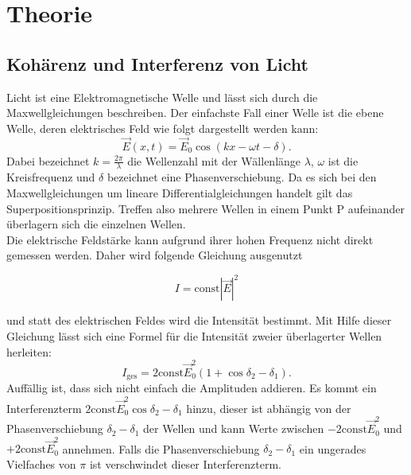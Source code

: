 
\section{Theorie}
\subsection{Kohärenz und Interferenz von Licht}
Licht ist eine Elektromagnetische Welle und lässt sich durch die Maxwellgleichungen
beschreiben. Der einfachste Fall einer Welle ist die ebene Welle, deren elektrisches Feld
wie folgt dargestellt werden kann:
\begin{equation}
  \vec{E}(x,t)=\vec{E}_{0}\cos(kx-\omega t -\delta)
  \label{eqn:eben}.
\end{equation}
Dabei bezeichnet $k=\frac{2\pi}{\lambda}$ die Wellenzahl mit der Wällenlänge $\lambda$,
$\omega$ ist die Kreisfrequenz und $\delta$ bezeichnet eine Phasenverschiebung.
Da es sich bei den Maxwellgleichungen um lineare Differentialgleichungen handelt
gilt das Superpositionsprinzip. Treffen also mehrere Wellen in einem Punkt P
aufeinander überlagern sich die einzelnen Wellen.\\
Die elektrische Feldstärke kann aufgrund ihrer hohen Frequenz %
nicht direkt gemessen werden. Daher wird folgende Gleichung ausgenutzt

\begin{equation}
  I=\text{const} |\vec{E}|^{2}
  \label{eqn:intensität}
\end{equation}

und statt des elektrischen Feldes wird die Intensität bestimmt.
\label{sec:Theorie}
Mit Hilfe dieser Gleichung lässt sich eine Formel für die Intensität zweier
überlagerter Wellen herleiten:
\begin{equation}
  I_{\text{ges}}=2\text{const}\vec{E}_{0}^{2}(1+\cos{\delta_{2}-\delta_{1}})
  \label{eqn:iges}.
\end{equation}
Auffällig ist, dass sich nicht einfach die Amplituden addieren. Es kommt ein Interferenzterm
$2\text{const}\vec{E}_{0}^{2}\cos{\delta_{2}-\delta_{1}}$ hinzu, dieser ist abhängig von
der Phasenverschiebung $\delta_{2}-\delta_{1}$ der Wellen und kann Werte zwischen
$-2\text{const}\vec{E}_{0}^{2}$ und $+2\text{const}\vec{E}_{0}^{2}$ annehmen.
Falls die Phasenverschiebung $\delta_{2}-\delta_{1}$ ein ungerades Vielfaches von
$\pi$ ist verschwindet dieser Interferenzterm.\\

